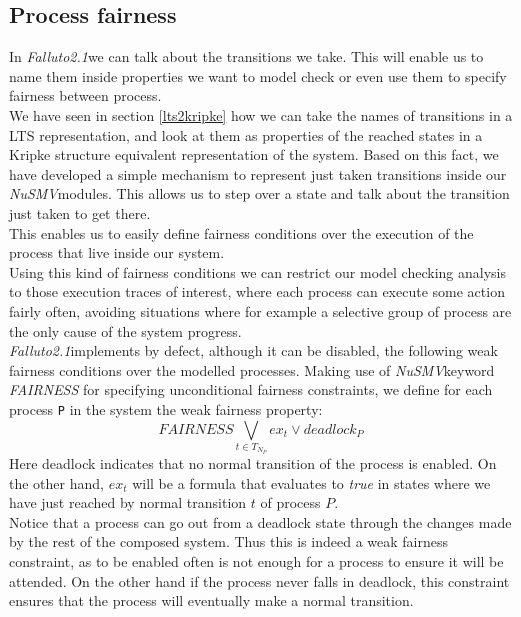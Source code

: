 \documentclass[12pt]{article}
\newcommand{\nusmv}{\mbox{\textit{NuSMV}}}
\newcommand{\falluto}{\mbox{\textit{Falluto2.1}}}
\begin{document}
\subsection{Process fairness}\label{process fairness}
In \falluto we can talk about the transitions we take. This will enable us to name them inside properties we want to model check or even use them to specify fairness between process.\\
We have seen in section \ref{lts2kripke} how we can take the names of transitions in a LTS representation, and look at them as properties of the reached states in a Kripke structure equivalent representation of the system. Based on this fact, we have developed a simple mechanism to represent just taken transitions inside our \nusmv modules. This allows us to step over a state and talk about the transition just taken to get there.\\
This enables us to easily define fairness
conditions over the execution of the process that live inside our system.\\
Using this kind of fairness conditions we can restrict our model
checking analysis to those execution traces of interest, where each process
can execute some action fairly often, avoiding situations where for example a
selective group of process are the only cause of the system progress.\\        %
\falluto implements by defect, although it can be disabled, the following weak fairness
conditions over the modelled processes. Making use of \nusmv keyword \textit{FAIRNESS} for specifying unconditional
fairness constraints, we define for each process \texttt{P} in the system the
weak fairness property:
$$FAIRNESS \bigvee_{t \in T_{N_{P}}} ex_t \vee deadlock_P$$
Here deadlock indicates that no normal transition of the process is enabled. On the other hand, $ex_t$ will be a formula that evaluates to \textit{true} in states where we have just reached by normal transition $t$ of process $P$.\\
Notice that a process can go out from a deadlock state through the
changes made by the rest of the composed system. Thus this is
indeed a weak fairness constraint, as to be enabled often is not enough for a
process to ensure it will be attended. On the other hand if the process never
falls in deadlock, this constraint ensures that the process will eventually
make a normal transition.
\end{document}
